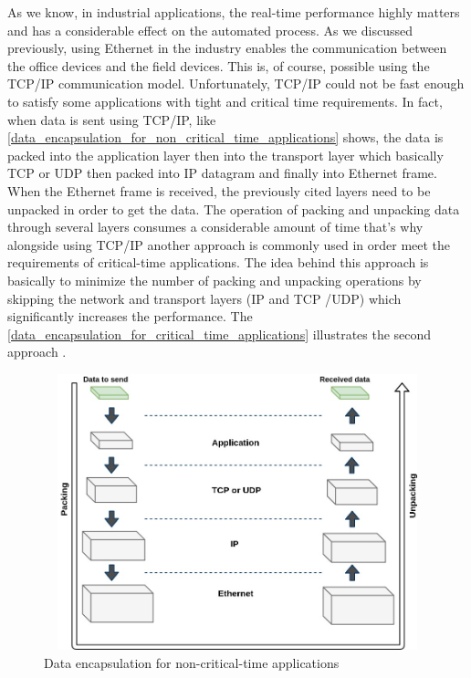 As we know, in industrial applications, the real-time performance highly matters and has a considerable effect on
the automated process. As we discussed previously, using Ethernet in the industry enables the communication
between the office devices and the field devices. This is, of course, possible using the \ac{TCP}/\ac{IP} communication model. Unfortunately, \ac{TCP}/\ac{IP}
could not be fast enough to satisfy some applications with tight and critical time requirements. In fact, when data is sent using  \ac{TCP}/\ac{IP}, like \autoref{data_encapsulation_for_non_critical_time_applications} shows, the data is packed
into the application layer then into the transport layer which basically \ac{TCP}   or \ac{UDP} then packed into \ac{IP} datagram and
finally into Ethernet frame. When the Ethernet frame is received, the previously cited layers need to be unpacked in
order to get the data. The operation of packing and unpacking data through several layers consumes a considerable amount
of time that's why alongside using \ac{TCP}/\ac{IP} another approach is commonly used in order meet the requirements of
critical-time applications. The idea behind this approach is basically to minimize the number of packing and unpacking
operations by skipping the network and transport layers (\ac{IP}  and \ac{TCP}   /\ac{UDP}) which significantly increases the
performance. The \autoref{data_encapsulation_for_critical_time_applications} illustrates the second approach \cite{profinet2013ethernet}.
\begin{figure}
\centering
\includegraphics[width=12cm,height=8cm]{figures/indutrial_ethernet/data_encapsulation_for_non_critical_time_applications.jpg}
\caption{Data encapsulation for non-critical-time applications}\label{data_encapsulation_for_non_critical_time_applications}
\end{figure}

